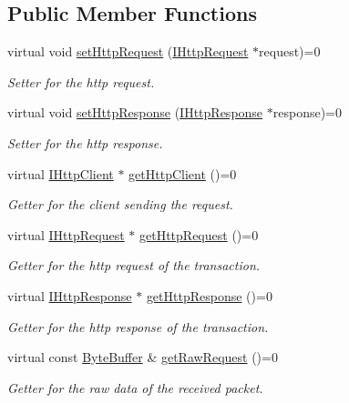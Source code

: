 \subsection*{Public Member Functions}
\begin{DoxyCompactItemize}
\item 
virtual void \hyperlink{class_a_p_i_kachu_1_1_i_http_transaction_a4d764f4e4e7e6a9f977cb849e56f9540}{set\+Http\+Request} (\hyperlink{class_a_p_i_kachu_1_1_i_http_request}{I\+Http\+Request} $\ast$request)=0
\begin{DoxyCompactList}\small\item\em Setter for the http request. \end{DoxyCompactList}\item 
virtual void \hyperlink{class_a_p_i_kachu_1_1_i_http_transaction_a42505225ef609ed6b2809b740fb1a057}{set\+Http\+Response} (\hyperlink{class_a_p_i_kachu_1_1_i_http_response}{I\+Http\+Response} $\ast$response)=0
\begin{DoxyCompactList}\small\item\em Setter for the http response. \end{DoxyCompactList}\item 
virtual \hyperlink{class_a_p_i_kachu_1_1_i_http_client}{I\+Http\+Client} $\ast$ \hyperlink{class_a_p_i_kachu_1_1_i_http_transaction_a5c36ff3eb4eda6cd2c981a7f595fe26f}{get\+Http\+Client} ()=0
\begin{DoxyCompactList}\small\item\em Getter for the client sending the request. \end{DoxyCompactList}\item 
virtual \hyperlink{class_a_p_i_kachu_1_1_i_http_request}{I\+Http\+Request} $\ast$ \hyperlink{class_a_p_i_kachu_1_1_i_http_transaction_a6e2cac980600fc7ac2f7d13c366e5e0a}{get\+Http\+Request} ()=0
\begin{DoxyCompactList}\small\item\em Getter for the http request of the transaction. \end{DoxyCompactList}\item 
virtual \hyperlink{class_a_p_i_kachu_1_1_i_http_response}{I\+Http\+Response} $\ast$ \hyperlink{class_a_p_i_kachu_1_1_i_http_transaction_a12da5989c6c9417c7c4b80e02345937c}{get\+Http\+Response} ()=0
\begin{DoxyCompactList}\small\item\em Getter for the http response of the transaction. \end{DoxyCompactList}\item 
virtual const \hyperlink{struct_a_p_i_kachu_1_1_byte_buffer}{Byte\+Buffer} \& \hyperlink{class_a_p_i_kachu_1_1_i_http_transaction_a83b2b8c2fc400512de18a996bae835ae}{get\+Raw\+Request} ()=0
\begin{DoxyCompactList}\small\item\em Getter for the raw data of the received packet. \end{DoxyCompactList}\end{DoxyCompactItemize}


